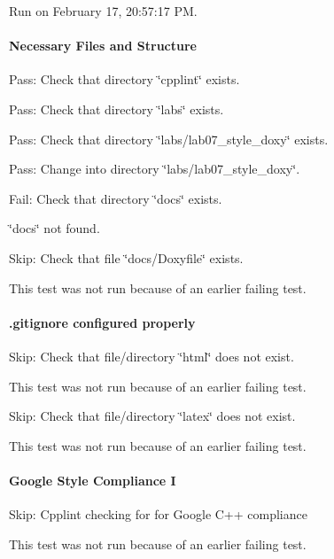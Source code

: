 Run on February 17, 20\+:57\+:17 PM.

\paragraph*{Necessary Files and Structure}


\begin{DoxyItemize}
\item Pass\+: Check that directory \char`\"{}cpplint\char`\"{} exists.
\item Pass\+: Check that directory \char`\"{}labs\char`\"{} exists.
\item Pass\+: Check that directory \char`\"{}labs/lab07\+\_\+style\+\_\+doxy\char`\"{} exists.
\item Pass\+: Change into directory \char`\"{}labs/lab07\+\_\+style\+\_\+doxy\char`\"{}.
\item Fail\+: Check that directory \char`\"{}docs\char`\"{} exists.

\char`\"{}docs\char`\"{} not found.
\item Skip\+: Check that file \char`\"{}docs/\+Doxyfile\char`\"{} exists.

This test was not run because of an earlier failing test.
\end{DoxyItemize}

\paragraph*{.gitignore configured properly}


\begin{DoxyItemize}
\item Skip\+: Check that file/directory \char`\"{}html\char`\"{} does not exist.

This test was not run because of an earlier failing test.
\item Skip\+: Check that file/directory \char`\"{}latex\char`\"{} does not exist.

This test was not run because of an earlier failing test.
\end{DoxyItemize}

\paragraph*{Google Style Compliance I}


\begin{DoxyItemize}
\item Skip\+: Cpplint checking for for Google C++ compliance

This test was not run because of an earlier failing test.
\end{DoxyItemize}

